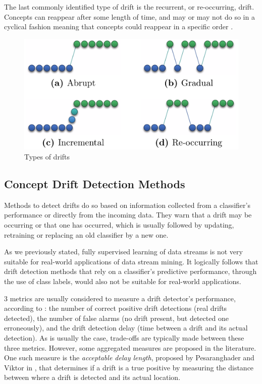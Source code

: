 The last commonly identified type of drift is the recurrent, or re-occurring, drift. Concepts can reappear after some length of time, and may or may not do so in a cyclical fashion meaning that concepts could reappear in a specific order \cite{tsymbal2004problem, KRAWCZYK2017132, bifet2018machine}.


\begin{figure}
  \includegraphics[width=\linewidth]{./images/chapter2/concept-drifts}
\caption{\label{fig:concept-drift-types}Types of drifts \cite{pesaranghader2018reservoirthesis}}
\end{figure}

\subsection{Concept Drift Detection Methods}
Methods to detect drifts do so based on information collected from a classifier's performance or directly from the incoming data. They warn that a drift may be occurring or that one has occurred, which is usually followed by updating, retraining or replacing an old classifier by a new one.

As we previously stated, fully supervised learning of data streams is not very suitable for real-world applications of data stream mining. It logically follows that drift detection methods that rely on a classifier's predictive performance, through the use of class labels, would also not be suitable for real-world applications.

3 metrics are usually considered to measure a drift detector's performance, according to \cite{KRAWCZYK2017132}: the number of correct positive drift detections (real drifts detected), the number of false alarms (no drift present, but detected one erroneously), and the drift detection delay (time between a drift and its actual detection).
As is usually the case, trade-offs are typically made between these three metrics. However, some aggregated measures are proposed in the literature. One such measure is the \textit{acceptable delay length}, proposed by Pesaranghader and Viktor in \cite{pesaranghader2016fast}, that determines if a drift is a true positive by measuring the distance between where a drift is detected and its actual location.

